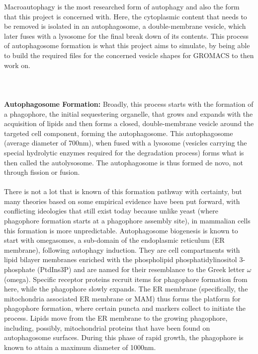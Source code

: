 \documentclass[12pt, a4paper]{report}
\begin{document}
Macroautophagy is the most researched form of autophagy and also the form that this project is concerned with. Here, the cytoplasmic content that needs to be removed is isolated in an autophagosome, a double-membrane vesicle, which later fuses with a lysosome for the final break down of its contents. This process of autophagosome formation is what this project aims to simulate, by being able to build the required files for the concerned vesicle shapes for GROMACS to then work on. 
\\~\\~\\~\\
\textbf{Autophagosome Formation:} Broadly, this process starts with the formation of a phagophore, the initial sequestering organelle, that grows and expands with the acquisition of lipids and then forms a closed, double-membrane vesicle around the targeted cell component, forming the autophagosome. This autophagosome (average diameter of 700nm), when fused with a lysosome (vesicles carrying the special hydrolytic enzymes required for the degradation process) forms what is then called the autolysosome. The autophagosome is thus formed de novo, not through fission or fusion. 
\\~\\
There is not a lot that is known of this formation pathway with certainty, but many theories based on some empirical evidence have been put forward, with conflicting ideologies that still exist today because unlike yeast (where phagophore formation starts at a phagophore assembly site), in mammalian cells this formation is more unpredictable. Autophagosome biogenesis is known to start with omegasomes, a sub-domain of the endoplasmic reticulum (ER membrane), following autophagy induction. They are cell compartments with lipid bilayer membranes enriched with the phospholipid phosphatidylinositol 3-phosphate (PtdIns3P) and are named for their resemblance to the Greek letter $\omega$ (omega). Specific receptor proteins recruit items for phagophore formation from here, while the phagophore slowly expands. The ER membrane (specifically, the mitochondria associated ER membrane or MAM) thus forms the platform for phagophore formation, where certain puncta and markers collect to initiate the process. Lipids move from the ER membrane to the growing phagophore, including, possibly, mitochondrial proteins that have been found on autophagosome surfaces. During this phase of rapid growth, the phagophore is known to attain a maximum diameter of 1000nm. 
\\~\\
\end{document}
